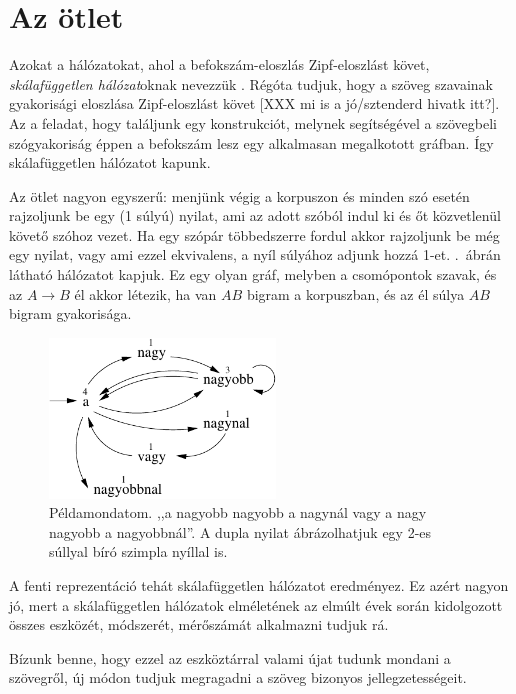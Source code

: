 \documentclass{llncs}
\newcommand{\matnyil}{\ensuremath{\rightarrow}}
\newcommand{\XXX}[1]{{\small \color{megjcolor} [XXX #1]}}
\begin{document}
\section{Az ötlet}

Azokat a hálózatokat, ahol a befokszám-eloszlás
Zipf-eloszlást követ, \emph{skálafüggetlen hálózat}oknak nevezzük
\cite[703.\ oldal]{kovacs2012magyar}.
%
Régóta tudjuk, hogy a szöveg szavainak gyakorisági eloszlása
Zipf-eloszlást követ \XXX{mi is a jó/sztenderd hivatk itt?}.
%
Az a feladat, hogy találjunk egy konstrukciót,
melynek segítségével a szövegbeli szógyakoriság
éppen a befokszám lesz egy alkalmasan megalkotott gráfban.
%
Így skálafüggetlen hálózatot kapunk.

Az ötlet nagyon egyszerű:
menjünk végig a korpuszon és
minden szó esetén rajzoljunk be egy (1 súlyú) nyilat,
ami az adott szóból indul ki és őt közvetlenül követő szóhoz vezet.
%
Ha egy szópár többedszerre fordul akkor rajzoljunk be még egy nyilat,
vagy ami ezzel ekvivalens, a nyíl súlyához adjunk hozzá 1-et.
%
.\ ábrán látható hálózatot kapjuk.
%
Ez egy olyan gráf, melyben a csomópontok szavak,
és az $A\matnyil B$ él akkor létezik, ha van $AB$ bigram a korpuszban,
és az él súlya $AB$ bigram gyakorisága.

\begin{figure}[h]
\begin{center}
\includegraphics[width=6cm]{scfr_pelda.pdf}
\end{center}
\caption{Példamondatom.
,,a nagyobb nagyobb a nagynál vagy a nagy nagyobb a nagyobbnál''.
A dupla nyilat ábrázolhatjuk egy 2-es súllyal bíró szimpla nyíllal is.
\label{fig:scfr_pelda}}
\end{figure}

A fenti reprezentáció tehát skálafüggetlen hálózatot eredményez.
%
Ez azért nagyon jó, mert a skálafüggetlen hálózatok elméletének
az elmúlt évek során kidolgozott összes 
eszközét, módszerét, mérőszámát alkalmazni tudjuk rá.

Bízunk benne, hogy ezzel az eszköztárral
valami újat tudunk mondani a szövegről,
új módon tudjuk megragadni a szöveg bizonyos jellegzetességeit.
\end{document}
